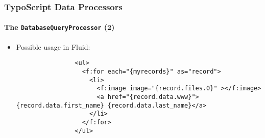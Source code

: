 \begin{frame}[fragile]
	\frametitle{TypoScript Data Processors}
	\framesubtitle{The \texttt{DatabaseQueryProcessor} (2)}

	\lstset{basicstyle=\tiny\ttfamily}

	\begin{itemize}

		\item Possible usage in Fluid:

			\begin{lstlisting}
				<ul>
				  <f:for each="{myrecords}" as="record">
				    <li>
				      <f:image image="{record.files.0}" ></f:image>
				      <a href="{record.data.www}">{record.data.first_name} {record.data.last_name}</a>
				    </li>
				  </f:for>
				</ul>
			\end{lstlisting}

	\end{itemize}

\end{frame}

